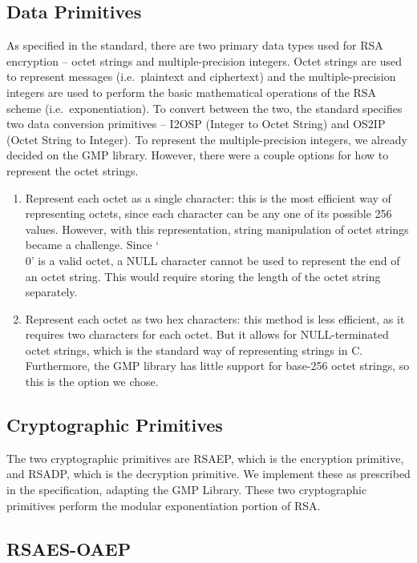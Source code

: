 \documentclass[a4paper]{article}
\begin{document}
\subsection{Data Primitives}
As specified in the standard, there are two primary data types used for RSA encryption – octet strings and multiple-precision integers. Octet strings are used to represent messages (i.e.\ plaintext and ciphertext) and the multiple-precision integers are used to perform the basic mathematical operations of the RSA scheme (i.e.\ exponentiation). To convert between the two, the standard specifies two data conversion primitives – I2OSP (Integer to Octet String) and OS2IP (Octet String to Integer). To represent the multiple-precision integers, we already decided on the GMP library. However, there were a couple options for how to represent the octet strings.

\begin{enumerate}
    \item Represent each octet as a single character: this is the most efficient way of representing octets, since each character can be any one of its possible 256 values. However, with this representation, string manipulation of octet strings became a challenge. Since ‘\\0' is a valid octet, a NULL character cannot be used to represent the end of an octet string. This would require storing the length of the octet string separately. 

    \item Represent each octet as two hex characters: this method is less efficient, as it requires two characters for each octet. But it allows for NULL-terminated octet strings, which is the standard way of representing strings in C. Furthermore, the GMP library has little support for base-256 octet strings, so this is the option we chose.
\end{enumerate}

\subsection{Cryptographic Primitives}

The two cryptographic primitives are RSAEP, which is the encryption primitive, and RSADP, which is the decryption primitive. We implement these as prescribed in the specification, adapting the GMP Library. These two cryptographic primitives perform the modular exponentiation portion of RSA.

\subsection{RSAES-OAEP}
\end{document}
